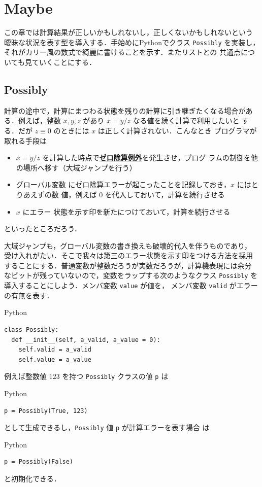 \documentclass[a5paper,twoside,fleqn,draft]{jsbook}
\newcommand{\programminglanguage}[1]{\textsf{#1}}
\newcommand{\python}{\programminglanguage{Python}}
\newenvironment{leader}{\begingroup\gt}{\endgroup}
\newcommand{\keyword}[1]{{\underline{\textbf{#1}}}}
\newcommand{\code}[1]{\texttt{#1}}
\newenvironment{pythoncode}{\begin{itembox}[r]{\python}}{\end{itembox}}
\begin{document}
\chapter{Maybe}
\label{ch:maybe}

\begin{leader}
この章では計算結果が正しいかもしれないし，正しくないかもしれないという
曖昧な状況を表す型を導入する．手始めに\python でクラス \code{Possibly}
を実装し，それがカリー風の数式で綺麗に書けることを示す．またリストとの
共通点についても見ていくことにする．
\end{leader}

\section{Possibly}

計算の途中で，計算にまつわる状態を残りの計算に引き継ぎたくなる場合があ
る．例えば，整数 $x,y,z$ があり $x=y/z$ なる値を続く計算で利用したいと
する．だが $z\equiv0$ のときには $x$ は正しく計算されない．こんなとき
プログラマが取れる手段は
\begin{itemize}
\item $x=y/z$ を計算した時点で\keyword{ゼロ除算例外}を発生させ，プログ
  ラムの制御を他の場所へ移す（大域ジャンプを行う）\item グローバル変数
  にゼロ除算エラーが起こったことを記録しておき，$x$ にはとりあえずの数
  値，例えば $0$ を代入しておいて，計算を続行させる\item $x$ にエラー
  状態を示す印を新たにつけておいて，計算を続行させる
\end{itemize}
といったところだろう．

大域ジャンプも，グローバル変数の書き換えも破壊的代入を伴うものであり，
受け入れがたい．そこで我々は第三のエラー状態を示す印をつける方法を採用
することにする．普通変数が整数だろうが実数だろうが，計算機表現には余分
なビットが残っていないので，変数をラップする次のようなクラス
\code{Possibly} を導入することにしよう．メンバ変数 \code{value} が値を，
メンバ変数 \code{valid} がエラーの有無を表す．
\begin{pythoncode}
\begin{verbatim}
class Possibly:
  def __init__(self, a_valid, a_value = 0):
    self.valid = a_valid
    self.value = a_value
\end{verbatim}
\end{pythoncode}

例えば整数値 $123$ を持つ \code{Possibly} クラスの値 \code{p} は
\begin{pythoncode}
\begin{verbatim}
p = Possibly(True, 123)
\end{verbatim}
\end{pythoncode}
として生成できるし，\code{Possibly} 値 \code{p} が計算エラーを表す場合
は
\begin{pythoncode}
\begin{verbatim}
p = Possibly(False)
\end{verbatim}
\end{pythoncode}
と初期化できる．
\end{document}
